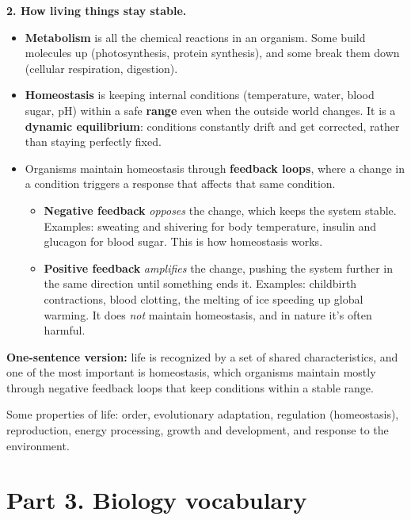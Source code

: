 \documentclass[11pt,letterpaper]{article}
\begin{document}
\textbf{2. How living things stay stable.}
\begin{itemize}
  \item \textbf{Metabolism} is all the chemical reactions in an organism. Some build molecules up (photosynthesis, protein synthesis), and some break them down (cellular respiration, digestion).
  \item \textbf{Homeostasis} is keeping internal conditions (temperature, water, blood sugar, pH) within a safe \textbf{range} even when the outside world changes. It is a \textbf{dynamic equilibrium}: conditions constantly drift and get corrected, rather than staying perfectly fixed.
  \item Organisms maintain homeostasis through \textbf{feedback loops}, where a change in a condition triggers a response that affects that same condition.
  \begin{itemize}
    \item \textbf{Negative feedback} \emph{opposes} the change, which keeps the system stable. Examples: sweating and shivering for body temperature, insulin and glucagon for blood sugar. This is how homeostasis works.
    \item \textbf{Positive feedback} \emph{amplifies} the change, pushing the system further in the same direction until something ends it. Examples: childbirth contractions, blood clotting, the melting of ice speeding up global warming. It does \emph{not} maintain homeostasis, and in nature it's often harmful.
  \end{itemize}
\end{itemize}

\textbf{One-sentence version:} life is recognized by a set of shared characteristics, and one of the most important is homeostasis, which organisms maintain mostly through negative feedback loops that keep conditions within a stable range.

  {Some properties of life: order, evolutionary adaptation, regulation (homeostasis), reproduction, energy processing, growth and development, and response to the environment.}

\section{Part 3. Biology vocabulary}
\end{document}
